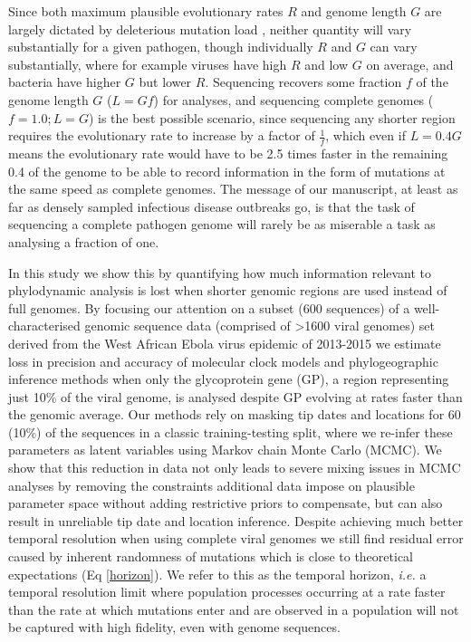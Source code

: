 \documentclass[11pt,oneside,letterpaper]{article}
\begin{document}
Since both maximum plausible evolutionary rates $R$ and genome length $G$ are largely dictated by deleterious mutation load \citep{gago_extremely_2009}, neither quantity will vary substantially for a given pathogen, though individually $R$ and $G$ can vary substantially, where for example viruses have high $R$ and low $G$ on average, and bacteria have higher $G$ but lower $R$.
Sequencing recovers some fraction $f$ of the genome length $G$ ($L=Gf$) for analyses, and sequencing complete genomes ($f=1.0; L = G$) is the best possible scenario, since sequencing any shorter region requires the evolutionary rate to increase by a factor of $\frac{1}{f}$, which even if $L = 0.4 G$ means the evolutionary rate would have to be 2.5 times faster in the remaining 0.4 of the genome to be able to record information in the form of mutations at the same speed as complete genomes.
The message of our manuscript, at least as far as densely sampled infectious disease outbreaks go, is that the task of sequencing a complete pathogen genome will rarely be as miserable a task as analysing a fraction of one.

In this study we show this by quantifying how much information relevant to phylodynamic analysis is lost when shorter genomic regions are used instead of full genomes.
By focusing our attention on a subset (600 sequences) of a well-characterised genomic sequence data (comprised of >1600 viral genomes) set derived from the West African Ebola virus epidemic of 2013-2015 \citep{dudas_virus_2017} we estimate loss in precision and accuracy of molecular clock models and phylogeographic inference methods when only the glycoprotein gene (GP), a region representing just 10\% of the viral genome, is analysed despite GP evolving at rates faster than the genomic average.
Our methods rely on masking tip dates and locations for 60 (10\%) of the sequences in a classic training-testing split, where we re-infer these parameters as latent variables using Markov chain Monte Carlo (MCMC).
We show that this reduction in data not only leads to severe mixing issues in MCMC analyses by removing the constraints additional data impose on plausible parameter space without adding restrictive priors to compensate, but can also result in unreliable tip date and location inference.
Despite achieving much better temporal resolution when using complete viral genomes we still find residual error caused by inherent randomness of mutations which is close to theoretical expectations (Eq \ref{horizon}).
We refer to this as the temporal horizon, \textit{i.e.} a temporal resolution limit where population processes occurring at a rate faster than the rate at which mutations enter and are observed in a population will not be captured with high fidelity, even with genome sequences.
\end{document}
